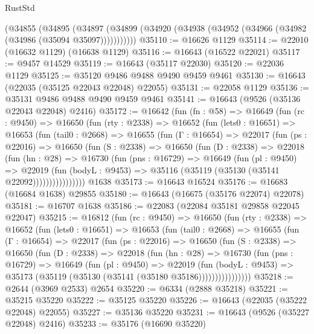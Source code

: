 \begin{lexlean}{RustStd}
\begin{coremodule}
    (@34855
      (@34895
        (@34897 (@34899 (@34920 (@34938 (@34952 (@34966 (@34982 (@34986 (@35094 @35097)))))))))))
@35110 := @16626 @1129
@35114 := @22010 (@16632 @1129) (@16638 @1129)
@35116 := @16643 (@16522 @22021)
@35117 := @9457 @14529
@35119 := @16643 (@35117 @22030)
@35120 := @22036 @1129
@35125 := @35120 @9486 @9488 @9490 @9459 @9461
@35130 := @16643 (@22035 (@35125 @22043 @22048) @22055)
@35131 := @22058 @1129
@35136 := @35131 @9486 @9488 @9490 @9459 @9461
@35141 := @16643 (@9526 (@35136 @22043 @22048) @2416)
@35172 := @16642
    (fun (fn : @58) =>
    @16649
      (fun (rc : @9450) =>
      @16650
        (fun (rty : @2338) =>
        @16652
          (fun (lets0 : @16651) =>
          @16653
            (fun (tail0 : @2668) =>
            @16655
              (fun (Γ : @16654) =>
              @22017
                (fun (ps : @22016) =>
                @16650
                  (fun (S : @2338) =>
                  @16650
                    (fun (D : @2338) =>
                    @22018
                      (fun (hn : @28) =>
                      @16730
                        (fun (pns : @16729) =>
                        @16649
                          (fun (pl : @9450) =>
                          @22019
                            (fun (bodyL : @9453) =>
                            @35116 (@35119 (@35130 (@35141 @22092))))))))))))))))
    @1638
@35173 := @16643 @16524
@35176 := @16683 (@16684 @1638) @29855
@35180 := @16643 (@16675 (@35176 @22074) @22078)
@35181 := @16707 @1638
@35186 := @22083 (@22084 @35181 @29858 @22045 @22047)
@35215 := @16812
    (fun (rc : @9450) =>
    @16650
      (fun (rty : @2338) =>
      @16652
        (fun (lets0 : @16651) =>
        @16653
          (fun (tail0 : @2668) =>
          @16655
            (fun (Γ : @16654) =>
            @22017
              (fun (ps : @22016) =>
              @16650
                (fun (S : @2338) =>
                @16650
                  (fun (D : @2338) =>
                  @22018
                    (fun (hn : @28) =>
                    @16730
                      (fun (pns : @16729) =>
                      @16649
                        (fun (pl : @9450) =>
                        @22019
                          (fun (bodyL : @9453) =>
                          @35173 (@35119 (@35130 (@35141 (@35180 @35186))))))))))))))))
@35218 := @2644 (@3969 @2533) @2654
@35220 := @6334 (@2888 @35218)
@35221 := @35215 @35220
@35222 := @35125 @35220
@35226 := @16643 (@22035 (@35222 @22048) @22055)
@35227 := @35136 @35220
@35231 := @16643 (@9526 (@35227 @22048) @2416)
@35233 := @35176 (@16690 @35220)

\end{coremodule}
\end{lexlean}
